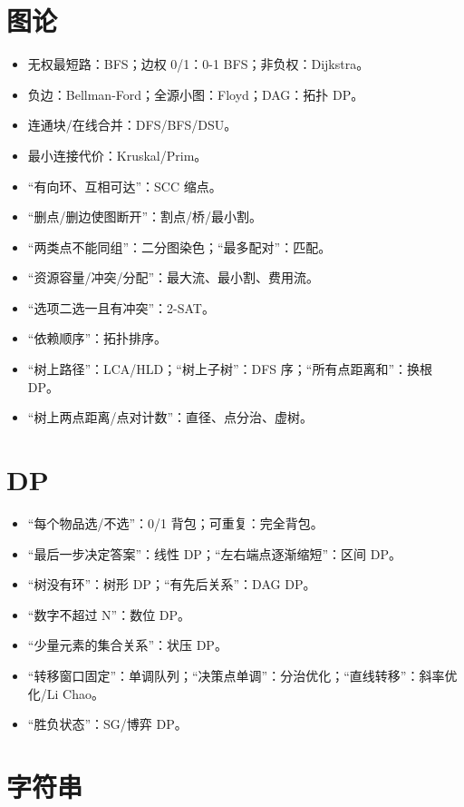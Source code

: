 \section{图论}\label{ux56feux8bba-1}

\begin{itemize}
\tightlist
\item
  无权最短路：BFS；边权 0/1：0-1 BFS；非负权：Dijkstra。
\item
  负边：Bellman-Ford；全源小图：Floyd；DAG：拓扑 DP。
\item
  连通块/在线合并：DFS/BFS/DSU。
\item
  最小连接代价：Kruskal/Prim。
\item
  ``有向环、互相可达''：SCC 缩点。
\item
  ``删点/删边使图断开''：割点/桥/最小割。
\item
  ``两类点不能同组''：二分图染色；``最多配对''：匹配。
\item
  ``资源容量/冲突/分配''：最大流、最小割、费用流。
\item
  ``选项二选一且有冲突''：2-SAT。
\item
  ``依赖顺序''：拓扑排序。
\item
  ``树上路径''：LCA/HLD；``树上子树''：DFS 序；``所有点距离和''：换根 DP。
\item
  ``树上两点距离/点对计数''：直径、点分治、虚树。
\end{itemize}

\section{DP}\label{dp}

\begin{itemize}
\tightlist
\item
  ``每个物品选/不选''：0/1 背包；可重复：完全背包。
\item
  ``最后一步决定答案''：线性 DP；``左右端点逐渐缩短''：区间 DP。
\item
  ``树没有环''：树形 DP；``有先后关系''：DAG DP。
\item
  ``数字不超过 N''：数位 DP。
\item
  ``少量元素的集合关系''：状压 DP。
\item
  ``转移窗口固定''：单调队列；``决策点单调''：分治优化；``直线转移''：斜率优化/Li Chao。
\item
  ``胜负状态''：SG/博弈 DP。
\end{itemize}

\section{字符串}\label{ux5b57ux7b26ux4e32}

